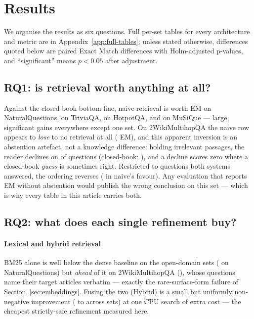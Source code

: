 \section{Results}
\label{sec:results}

We organise the results as six questions. Full per-set tables for every
architecture and metric are in Appendix~\ref{app:full-tables}; unless
stated otherwise, differences quoted below are paired Exact Match
differences with Holm-adjusted p-values, and ``significant'' means
$p<0.05$ after adjustment.

\subsection{RQ1: is retrieval worth anything at all?}
\label{sec:results-worth}

Against the closed-book bottom line, naive retrieval is worth
\ClosedBookVsNaiveNQExactMatchDiff{} EM on NaturalQuestions,
\ClosedBookVsNaiveTriviaQAExactMatchDiff{} on TriviaQA,
\ClosedBookVsNaiveHotpotQAExactMatchDiff{} on HotpotQA, and
\ClosedBookVsNaiveMuSiQueExactMatchDiff{} on MuSiQue --- large,
significant gains everywhere except one set. On 2WikiMultihopQA the naive
row appears to \emph{lose} to no retrieval at all
(\ClosedBookVsNaiveTwoWikiExactMatchDiff{} EM), and this apparent
inversion is an abstention artefact, not a knowledge difference: holding
irrelevant passages, the reader declines on
\NaiveRAGTwoWikiAbstentionRate{} of questions (closed-book:
\ClosedBookTwoWikiAbstentionRate), and a decline scores zero where a
closed-book \emph{guess} is sometimes right. Restricted to questions both
systems answered, the ordering reverses
(\ClosedBookVsNaiveTwoWikiEMbothansweredDiff{} in naive's favour). Any
evaluation that reports EM without abstention would publish the wrong
conclusion on this set --- which is why every table in this article
carries both.

\subsection{RQ2: what does each single refinement buy?}
\label{sec:results-single}

\paragraph{Lexical and hybrid retrieval} BM25 alone is well below the
dense baseline on the open-domain sets
(\NaiveVsBMTwentyFiveNQExactMatchDiff{} on NaturalQuestions) but
\emph{ahead} of it on 2WikiMultihopQA
(\NaiveVsBMTwentyFiveTwoWikiExactMatchDiff), whose questions name their
target articles verbatim --- exactly the rare-surface-form failure of
Section~\ref{sec:embeddings}. Fusing the two (Hybrid) is a small but
uniformly non-negative improvement
(\NaiveVsHybridNQExactMatchDiff{} to
\NaiveVsHybridTwoWikiExactMatchDiff{} across sets) at one CPU search of
extra cost --- the cheapest strictly-safe refinement measured here.

